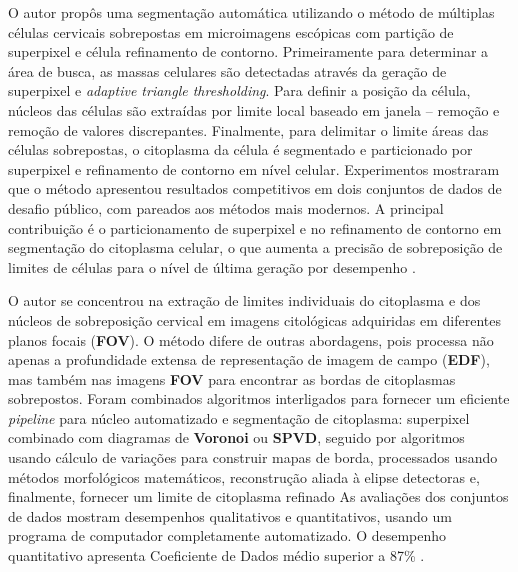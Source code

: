 \documentclass[12pt]{article}
\begin{document}
O autor propôs uma segmentação automática utilizando o método de múltiplas células cervicais sobrepostas em microimagens
escópicas com partição de superpixel e célula refinamento de contorno. Primeiramente para determinar a área de busca, 
as massas celulares são detectadas através da geração de superpixel e \textit{adaptive triangle thresholding}. Para definir
a posição da célula, núcleos das células são extraídas por limite local baseado em janela – remoção
e remoção de valores discrepantes. Finalmente, para delimitar o limite áreas das células sobrepostas, o citoplasma da célula é segmentado e particionado por superpixel e refinamento de contorno em nível celular. Experimentos mostraram
que o método apresentou resultados competitivos em dois conjuntos de dados de desafio público, com
pareados aos métodos mais modernos. A principal contribuição é o particionamento de superpixel e no refinamento de contorno em
segmentação do citoplasma celular, o que aumenta a precisão de sobreposição de limites de células para o nível de última geração por
desempenho \cite{lee2016segmentation}.

O autor se concentrou na extração de limites individuais do citoplasma e dos núcleos de sobreposição cervical em
imagens citológicas adquiridas em diferentes planos focais (\textbf{FOV}). O método difere de outras abordagens, pois processa não apenas a profundidade extensa de representação de imagem de campo (\textbf{EDF}), mas também nas imagens \textbf{FOV} para encontrar as bordas de citoplasmas sobrepostos. Foram combinados algoritmos interligados para fornecer um eficiente \textit{pipeline} para núcleo automatizado e segmentação de citoplasma: superpixel combinado com diagramas de \textbf{Voronoi} ou \textbf{SPVD}, seguido por algoritmos usando cálculo de variações para construir mapas de borda, processados usando métodos morfológicos matemáticos, reconstrução aliada à elipse detectoras e, finalmente, fornecer um limite de citoplasma refinado As avaliações dos conjuntos de dados mostram desempenhos qualitativos e quantitativos, usando um programa de computador completamente automatizado. O desempenho quantitativo apresenta Coeficiente de Dados médio superior a 87\% \cite{ramalho2015cell}.
\end{document}
